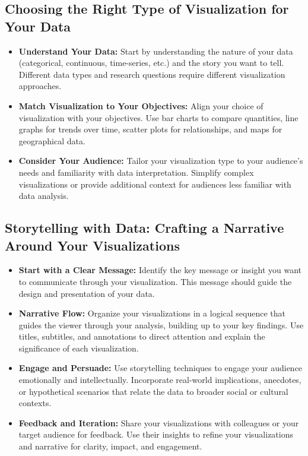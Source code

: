 \documentclass[
]{book}
\begin{document}
\hypertarget{choosing-the-right-type-of-visualization-for-your-data}{%
\subsection{Choosing the Right Type of Visualization for Your Data}\label{choosing-the-right-type-of-visualization-for-your-data}}

\begin{itemize}
\item
  \textbf{Understand Your Data:} Start by understanding the nature of your data (categorical, continuous, time-series, etc.) and the story you want to tell. Different data types and research questions require different visualization approaches.
\item
  \textbf{Match Visualization to Your Objectives:} Align your choice of visualization with your objectives. Use bar charts to compare quantities, line graphs for trends over time, scatter plots for relationships, and maps for geographical data.
\item
  \textbf{Consider Your Audience:} Tailor your visualization type to your audience's needs and familiarity with data interpretation. Simplify complex visualizations or provide additional context for audiences less familiar with data analysis.
\end{itemize}

\hypertarget{storytelling-with-data-crafting-a-narrative-around-your-visualizations}{%
\subsection{Storytelling with Data: Crafting a Narrative Around Your Visualizations}\label{storytelling-with-data-crafting-a-narrative-around-your-visualizations}}

\begin{itemize}
\item
  \textbf{Start with a Clear Message:} Identify the key message or insight you want to communicate through your visualization. This message should guide the design and presentation of your data.
\item
  \textbf{Narrative Flow:} Organize your visualizations in a logical sequence that guides the viewer through your analysis, building up to your key findings. Use titles, subtitles, and annotations to direct attention and explain the significance of each visualization.
\item
  \textbf{Engage and Persuade:} Use storytelling techniques to engage your audience emotionally and intellectually. Incorporate real-world implications, anecdotes, or hypothetical scenarios that relate the data to broader social or cultural contexts.
\item
  \textbf{Feedback and Iteration:} Share your visualizations with colleagues or your target audience for feedback. Use their insights to refine your visualizations and narrative for clarity, impact, and engagement.
\end{itemize}
\end{document}

